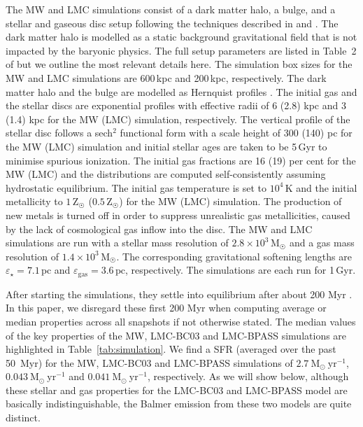 \documentclass[fleqn,usenatbib]{mnras}
\newcommand\Msun{\text{M}_{\astrosun}} %
\newcommand\Zsun{\text{Z}_{\astrosun}} %
\begin{document}
The MW and LMC simulations consist of a dark matter halo, a bulge, and a stellar and gaseous disc setup following the techniques described in \citet{hernquist93} and \citet{springel05}. The dark matter halo is modelled as a static background gravitational field that is not impacted by the baryonic physics. The full setup parameters are listed in Table~2 of \citet{kannan20_mw} but we outline the most relevant details here. The simulation box sizes for the MW and LMC simulations are 600\,kpc and 200\,kpc, respectively. The dark matter halo and the bulge are modelled as Hernquist profiles \citep{hernquist90}. The initial gas and the stellar discs are exponential profiles with effective radii of 6 (2.8) kpc and 3 (1.4) kpc for the MW (LMC) simulation, respectively. The vertical profile of the stellar disc follows a sech$^2$ functional form with a scale height of 300 (140) pc for the MW (LMC) simulation and initial stellar ages are taken to be 5\,Gyr to minimise spurious ionization. The initial gas fractions are 16 (19) per cent for the MW (LMC) and the distributions are computed self-consistently assuming hydrostatic equilibrium. The initial gas temperature is set to $10^4\,\text{K}$ and the initial metallicity to $1\,\Zsun$ ($0.5\,\Zsun$) for the MW (LMC) simulation. The production of new metals is turned off in order to suppress unrealistic gas metallicities, caused by the lack of cosmological gas inflow into the disc. The MW and LMC simulations are run with a stellar mass resolution of $2.8 \times 10^3\,\Msun$ and a gas mass resolution of $1.4 \times 10^3\,\Msun$. The corresponding gravitational softening lengths are $\varepsilon_{\star} = 7.1\,\text{pc}$ and $\varepsilon_\text{gas} = 3.6\,\text{pc}$, respectively. The simulations are each run for 1\,Gyr.

After starting the simulations, they settle into equilibrium after about 200 Myr \citep{kannan20_mw}. In this paper, we disregard these first 200 Myr when computing average or median properties across all snapshots if not otherwise stated. The median values of the key properties of the MW, LMC-BC03 and LMC-BPASS simulations are highlighted in Table~\ref{tab:simulation}. We find a SFR (averaged over the past 50~Myr) for the MW, LMC-BC03 and LMC-BPASS simulations of $2.7~\text{M}_{\odot}~\mathrm{yr}^{-1}$, $0.043~\text{M}_{\odot}~\mathrm{yr}^{-1}$ and $0.041~\text{M}_{\odot}~\mathrm{yr}^{-1}$, respectively. As we will show below, although these stellar and gas properties for the LMC-BC03 and LMC-BPASS model are basically indistinguishable, the Balmer emission from these two models are quite distinct. 
\end{document}

